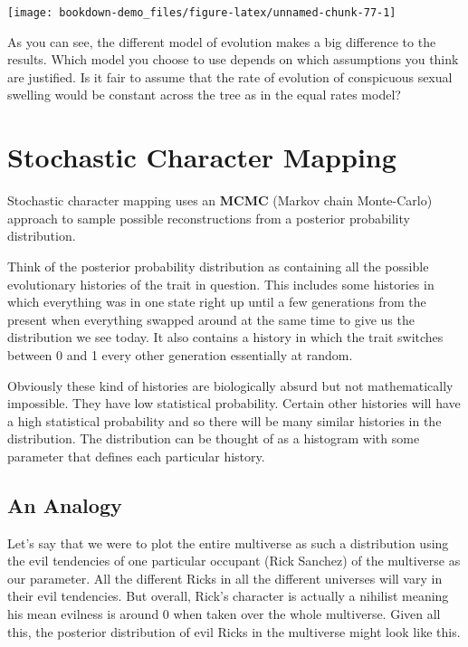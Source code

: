 \documentclass[
]{book}
\begin{document}
\begin{center}\texttt{[image: bookdown-demo\_files/figure-latex/unnamed-chunk-77-1]} \end{center}

As you can see, the different model of evolution makes a big difference to the results. Which model you choose to use depends on which assumptions you think are justified. Is it fair to assume that the rate of evolution of conspicuous sexual swelling would be constant across the tree as in the equal rates model?

\hypertarget{stochastic-character-mapping}{%
\section{Stochastic Character Mapping}\label{stochastic-character-mapping}}

Stochastic character mapping uses an \textbf{MCMC} (Markov chain Monte-Carlo) approach to sample possible reconstructions from a posterior probability distribution.

Think of the posterior probability distribution as containing all the possible evolutionary histories of the trait in question. This includes some histories in which everything was in one state right up until a few generations from the present when everything swapped around at the same time to give us the distribution we see today. It also contains a history in which the trait switches between 0 and 1 every other generation essentially at random.

Obviously these kind of histories are biologically absurd but not mathematically impossible. They have low statistical probability. Certain other histories will have a high statistical probability and so there will be many similar histories in the distribution. The distribution can be thought of as a histogram with some parameter that defines each particular history.

\hypertarget{an-analogy}{%
\subsection{An Analogy}\label{an-analogy}}

Let's say that we were to plot the entire multiverse as such a distribution using the evil tendencies of one particular occupant (Rick Sanchez) of the multiverse as our parameter. All the different Ricks in all the different universes will vary in their evil tendencies. But overall, Rick's character is actually a nihilist meaning his mean evilness is around 0 when taken over the whole multiverse. Given all this, the posterior distribution of evil Ricks in the multiverse might look like this.
\end{document}
